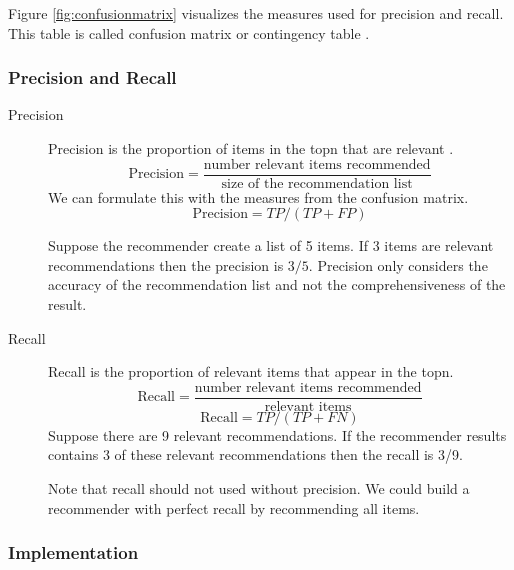 Figure \ref{fig:confusionmatrix} visualizes the measures used for precision and recall. This table is called confusion matrix or contingency table \cite{Manning}. 

\subsubsection{Precision and Recall}
\label{sec:precision}

\begin{description}
\item[Precision] Precision is the proportion of items in the \gls{topn} that are relevant \cite{Manning}.
  \begin{equation}
    \label{eq:precision}
    \text{Precision} = \frac{\text{number relevant items recommended}}{\text{size of the recommendation list}}
  \end{equation}
We can formulate this with the measures from the confusion matrix.
  \begin{equation}
    \label{eq:precisionm}
    \text{Precision} = TP/(TP+FP)
  \end{equation}

 Suppose the recommender create a list of 5 items. If 3 items are relevant recommendations then the precision is $3/5$. 
Precision only considers the accuracy of the recommendation list and not the comprehensiveness of the result.

\item[Recall] Recall is the proportion of relevant items that appear in the \gls{topn}. 
  \begin{equation}
    \label{eq:recall}
    \text{Recall} = \frac{\text{number relevant items recommended}}{\text{relevant items}}
  \end{equation}
  \begin{equation}
    \label{eq:recallcm}
    \text{Recall} = TP/(TP+FN)
  \end{equation}
Suppose there are 9 relevant recommendations. If the recommender results contains 3 of these relevant recommendations then the recall is 3/9.

Note that recall should not used without precision. We could build a recommender with perfect recall by recommending all items.
\end{description}

\subsubsection{Implementation}
\label{sec:irimpl}

